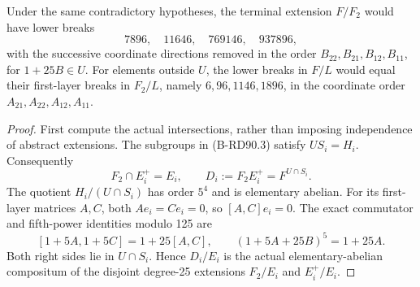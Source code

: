 \begin{proposition}
\label{prop:B-RD90-terminal}
Under the same contradictory hypotheses, the terminal extension
\(F/F_2\) would have lower breaks
\[
                7896,\quad11646,\quad769146,\quad937896,
 \tag{B-RD90.8}
\]
with the successive coordinate directions removed in the order
\(B_{22},B_{21},B_{12},B_{11}\), for \(1+25B\in U\).
For elements outside \(U\), the lower breaks in \(F/L\) would
equal their first-layer breaks in \(F_2/L\), namely
\(6,96,1146,1896\), in the coordinate order
\(A_{21},A_{22},A_{12},A_{11}\).
\end{proposition}
\begin{proof}
First compute the actual intersections, rather than imposing
independence of abstract extensions. The subgroups in (B-RD90.3)
satisfy \(US_i=H_i\). Consequently
\[
 F_2\cap E_i^+=E_i,\qquad D_i:=F_2E_i^+=F^{U\cap S_i}.
 \tag{B-RD90.9}
\]
The quotient \(H_i/(U\cap S_i)\) has order \(5^4\) and is
elementary abelian. For its first-layer matrices \(A,C\), both
\(Ae_i=Ce_i=0\), so \([A,C]e_i=0\). The exact commutator
and fifth-power identities modulo 125 are
\[
 [1+5A,1+5C]=1+25[A,C],\qquad
       (1+5A+25B)^5=1+25A.
 \tag{B-RD90.10}
\]
Both right sides lie in \(U\cap S_i\). Hence \(D_i/E_i\) is
the actual elementary-abelian compositum of the disjoint
degree-25 extensions \(F_2/E_i\) and \(E_i^+/E_i\).


\end{proof}
